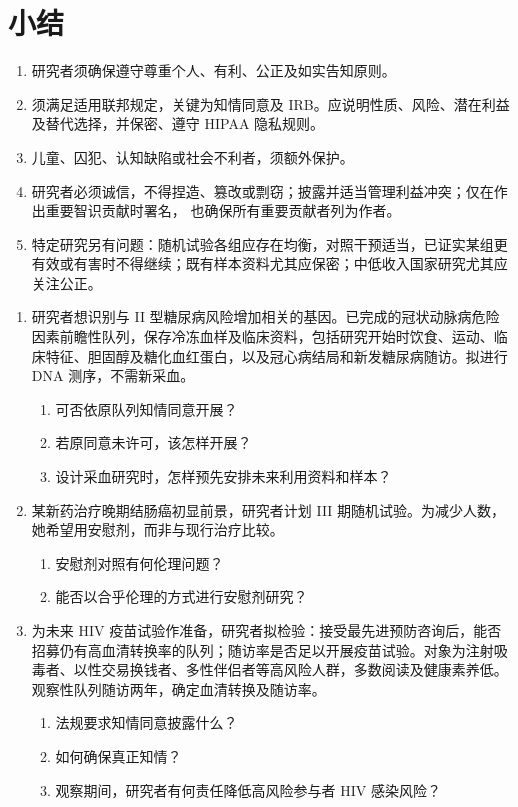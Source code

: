 \section{小结}
\begin{enumerate}
\item 研究者须确保遵守尊重个人、有利、公正及如实告知原则。
\item 须满足适用联邦规定，关键为知情同意及 IRB。应说明性质、风险、潜在利益及替代选择，并保密、遵守 HIPAA 隐私规则。
\item 儿童、囚犯、认知缺陷或社会不利者，须额外保护。
\item 研究者必须诚信，不得捏造、篡改或剽窃；披露并适当管理利益冲突；仅在作出重要智识贡献时署名，
也确保所有重要贡献者列为作者。
\item 特定研究另有问题：随机试验各组应存在均衡，对照干预适当，已证实某组更有效或有害时不得继续；既有样本资料尤其应保密；中低收入国家研究尤其应关注公正。
\end{enumerate}

\begin{enumerate}
\item 研究者想识别与 II 型糖尿病风险增加相关的基因。已完成的冠状动脉病危险因素前瞻性队列，保存冷冻血样及临床资料，包括研究开始时饮食、运动、临床特征、胆固醇及糖化血红蛋白，以及冠心病结局和新发糖尿病随访。拟进行 DNA 测序，不需新采血。
\begin{enumerate}
\item 可否依原队列知情同意开展？
\item 若原同意未许可，该怎样开展？
\item 设计采血研究时，怎样预先安排未来利用资料和样本？
\end{enumerate}
\item 某新药治疗晚期结肠癌初显前景，研究者计划 III 期随机试验。为减少人数，她希望用安慰剂，而非与现行治疗比较。
\begin{enumerate}
\item 安慰剂对照有何伦理问题？
\item 能否以合乎伦理的方式进行安慰剂研究？
\end{enumerate}
\item 为未来 HIV 疫苗试验作准备，研究者拟检验：接受最先进预防咨询后，能否招募仍有高血清转换率的队列；随访率是否足以开展疫苗试验。对象为注射吸毒者、以性交易换钱者、多性伴侣者等高风险人群，多数阅读及健康素养低。观察性队列随访两年，确定血清转换及随访率。
\begin{enumerate}
\item 法规要求知情同意披露什么？
\item 如何确保真正知情？
\item 观察期间，研究者有何责任降低高风险参与者 HIV 感染风险？
\end{enumerate}
\end{enumerate}
